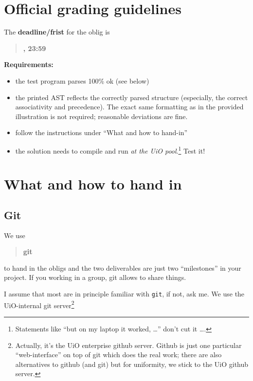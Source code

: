 \documentclass[10pt,freeform]{handout}[2014/08/13]
\begin{document}
\thispagestyle{empty}

\section{Official grading guidelines}
\label{sec:official-info}




\hrulefill{}

The \textbf{deadline/frist}  for the oblig is

\begin{quote}
  \textbf{\deadlineone, 23:59} %
\end{quote}

\textbf{Requirements:}


\begin{itemize}
\item the test program parses 100\% ok (see below)
\item the printed AST reflects the correctly parsed structure (especially,
  the correct associativity and precedence). The exact same formatting as
  in the provided illustration is not required; reasonable deviations are
  fine.
\item follow the instructions under ``What and how to  hand-in''
\item the solution needs to compile and run \emph{at the UiO
    pool}.\footnote{Statements like ``but on my laptop it worked, \ldots''
    don't cut it \ldots.} Test it!
\end{itemize}

\hrulefill




\section{What and how to hand in}
\label{sec:what-how}


\subsection{Git}
\label{sec:git}



We use
\begin{quote}
  \textbf{git}   
\end{quote}
to hand in the obligs and the two deliverables are just two ``milestones''
in your project. If you working in a group, git allows to share things.

I assume that most are in principle familiar with \texttt{git}, if not, ask
me.  We use the UiO-internal git server\footnote{Actually, it's the UiO
  enterprise github server. Github is just one particular ``web-interface''
  on top of git which does the real work; there are also alternatives to
  github (and git) but for uniformity, we stick to the UiO github server.}
\end{document}
